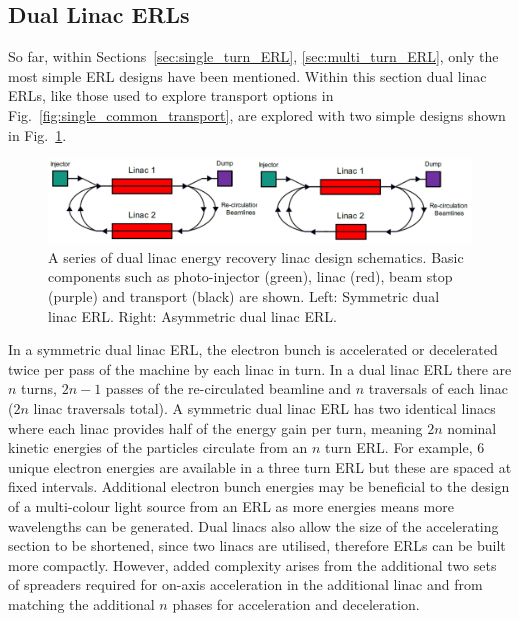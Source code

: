 \documentclass[../main.tex]{subfiles}
\begin{document}
\subsection{Dual Linac ERLs}
\label{sec:dual_linac_ERL}

So far, within Sections~\ref{sec:single_turn_ERL}, \ref{sec:multi_turn_ERL}, only the most simple ERL designs have been mentioned. Within this section dual linac ERLs, like those used to explore transport options in Fig.~\ref{fig:single_common_transport}, are explored with two simple designs shown in Fig.~\ref{fig:dual_linac_ERL_designs}.
\begin{figure}[!h]
\centering
\includegraphics[width=\textwidth]{Figures/Energy_Recovery_Linac_Design/dual_linac_ERLs.pdf}
\caption{A series of dual linac energy recovery linac design schematics. Basic components such as photo-injector (green), linac (red), beam stop (purple) and transport (black) are shown. Left: Symmetric dual linac ERL. Right: Asymmetric dual linac ERL.}
\label{fig:dual_linac_ERL_designs}
\end{figure}

In a symmetric dual linac ERL, the electron bunch is accelerated or decelerated twice per pass of the machine by each linac in turn. In a dual linac ERL there are $n$ turns, $2n-1$ passes of the re-circulated beamline and $n$ traversals of each linac ($2n$ linac traversals total). A symmetric dual linac ERL has two identical linacs where each linac provides half of the energy gain per turn, meaning $2n$ nominal kinetic energies of the particles circulate from an $n$ turn ERL. For example, 6 unique electron energies are available in a three turn ERL but these are spaced at fixed intervals. Additional electron bunch energies may be beneficial to the design of a multi-colour light source from an ERL as more energies means more wavelengths can be generated. Dual linacs also allow the size of the accelerating section to be shortened, since two linacs are utilised, therefore ERLs can be built more compactly. However, added complexity arises from the additional two sets of spreaders required for on-axis acceleration in the additional linac and from matching the additional $n$ phases for acceleration and deceleration. 
\end{document}
